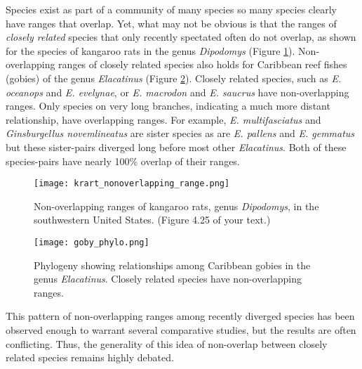 \documentclass[12pt, oneside]{article}   	%
\begin{document}
Species exist as part of a community of many species so many species clearly have ranges that overlap. Yet, what may not be obvious is that the ranges of \emph{closely related} species that only recently spectated often do not overlap, as shown for the species of kangaroo rats in the genus \emph{Dipodomys} (Figure \ref{krat range}).  Non-overlapping ranges of closely related species also holds for Caribbean reef fishes (gobies) of the genus \emph{Elacatinus} (Figure \ref{elacatinus}). Closely related species, such as \emph{E. oceanops} and \emph{E. evelynae}, or \emph{E. macrodon} and \emph{E. saucrus} have non-overlapping ranges.  Only species on very long branches, indicating a much more distant relationship, have overlapping ranges.  For example, \emph{E. multifasciatus} and \emph{Ginsburgellus novemlineatus} are sister species as are \emph{E. pallens} and \emph{E. gemmatus} but these sister-pairs diverged long before most other \emph{Elacatinus}. Both of these species-pairs have nearly 100\% overlap of their ranges.

\begin{figure}[tb]
	\centering
		\texttt{[image: krart\_nonoverlapping\_range.png]}  
		\caption{Non-overlapping ranges of kangaroo rats, genus \emph{Dipodomys}, in the southwestern United States. (Figure 4.25 of your text.)\label{krat range}}
\end{figure}

\begin{figure}[tb]
	\centering
		\texttt{[image: goby\_phylo.png]}  
		\caption{Phylogeny showing relationships among Caribbean gobies in the genus \emph{Elacatinus}. Closely related species have non-overlapping ranges.\label{elacatinus}}
\end{figure}

This pattern of non-overlapping ranges among recently diverged species has been observed enough to warrant several comparative studies, but the results are often conflicting.  Thus, the generality of this idea of non-overlap between closely related species remains highly debated.
\end{document}
